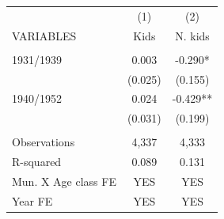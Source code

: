 \begin{tabular}{lcc} \hline
 & (1) & (2) \\
VARIABLES & Kids & N. kids \\ \hline
 &  &  \\
1931/1939 & 0.003 & -0.290* \\
 & (0.025) & (0.155) \\
1940/1952 & 0.024 & -0.429** \\
 & (0.031) & (0.199) \\
 &  &  \\
Observations & 4,337 & 4,333 \\
R-squared & 0.089 & 0.131 \\
Mun. X Age class FE & YES & YES \\
 Year FE & YES & YES \\ \hline
\end{tabular}
